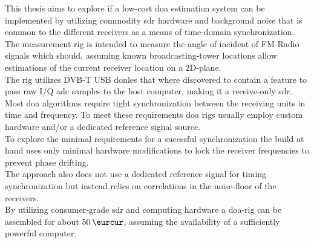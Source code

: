 This thesis aims to explore if a low-cost \gls{doa} estimation
system can be implemented by utilizing commodity \gls{sdr} hardware
and background noise that is common to the different receivers as
a means of time-domain synchronization. \\

The measurement rig is intended to measure the angle of incident
of FM-Radio signals which should, assuming known broadcasting-tower
locations allow estimations of the current receiver location on
a 2D-plane. \\

The rig utilizes DVB-T USB donles that where discovered \cite{rtlhistory}
to contain a feature to pass raw I/Q \acrshort{adc} samples
to the host computer, making it a receive-only \gls{sdr}. \\

Most \gls{doa} algorithms require tight synchronization between
the receiving units in time and frequency. To meet these requirements
\gls{doa} rigs usually employ custom hardware and/or a dedicated
reference signal source. \\

To explore the minimal requirements for a sucessful synchronization
the build at hand uses only minimal hardware modifications
to lock the receiver frequencies to prevent phase drifting. \\

The approach also does not use a dedicated reference signal
for timing synchronization but instead relies on correlations
in the noise-floor of the receivers. \\

By utilizing consumer-grade \gls{sdr} and computing hardware
a \gls{doa}-rig can be assembled for about $\SI{50}{\eurcur}$,
assuming the availability of a sufficiently powerful computer.
